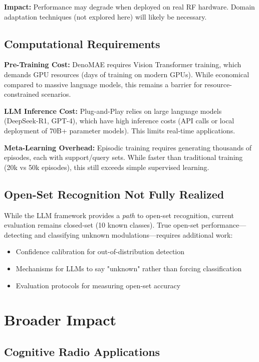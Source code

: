 \textbf{Impact:} Performance may degrade when deployed on real RF hardware. Domain adaptation techniques (not explored here) will likely be necessary.

\subsection{Computational Requirements}

\textbf{Pre-Training Cost:} DenoMAE requires Vision Transformer training, which demands GPU resources (days of training on modern GPUs). While economical compared to massive language models, this remains a barrier for resource-constrained scenarios.

\textbf{LLM Inference Cost:} Plug-and-Play relies on large language models (DeepSeek-R1, GPT-4), which have high inference costs (API calls or local deployment of 70B+ parameter models). This limits real-time applications.

\textbf{Meta-Learning Overhead:} Episodic training requires generating thousands of episodes, each with support/query sets. While faster than traditional training (20k vs 50k episodes), this still exceeds simple supervised learning.

\subsection{Open-Set Recognition Not Fully Realized}

While the LLM framework provides a \textit{path} to open-set recognition, current evaluation remains closed-set (10 known classes). True open-set performance—detecting and classifying unknown modulations—requires additional work:
\begin{itemize}
    \item Confidence calibration for out-of-distribution detection
    \item Mechanisms for LLMs to say "unknown" rather than forcing classification
    \item Evaluation protocols for measuring open-set accuracy
\end{itemize}

\section{Broader Impact}

\subsection{Cognitive Radio Applications}

